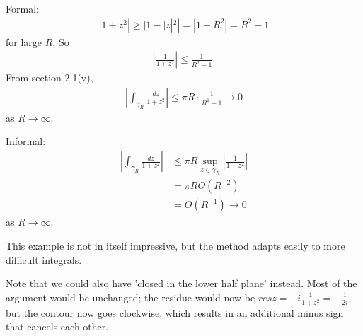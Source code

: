\documentclass[a4paper]{article}
\begin{document}
Formal:
\begin{equation*}
\begin{aligned}
|1+z^2| \geq |1-|z|^2| = |1-R^2| = R^2-1
\end{aligned}
\end{equation*}
for large $R$. So
\begin{equation*}
\begin{aligned}
\left|\frac{1}{1+z^2}\right| \leq \frac{1}{R^2-1}.
\end{aligned}
\end{equation*}
From section 2.1(v),
\begin{equation*}
\begin{aligned}
\left| \int_{\gamma_R} \frac{dz}{1+z^2} \right| \leq \pi R \cdot \frac{1}{R^1-1} \to 0
\end{aligned}
\end{equation*}
as $R \to \infty$.

Informal:
\begin{equation*}
\begin{aligned}
\left|\int_{\gamma_R} \frac{dz}{1+z^2}\right| &\leq \pi R \sup_{z \in \gamma_R} \left|\frac{1}{1+z^2}\right|\\
&= \pi R O(R^{-2})\\
&= O(R^{-1}) \to 0
\end{aligned}
\end{equation*}
as $R \to \infty$.

This example is not in itself impressive, but the method adapts easily to more difficult integrals.

Note that we could also have 'closed in the lower half plane' instead. Most of the argument would be unchanged; the residue would now be $res{z=-i} \frac{1}{1+z^2} = -\frac{1}{2i}$, but the contour now goes clockwise, which results in an additional minus sign that cancels each other.
\end{document}
